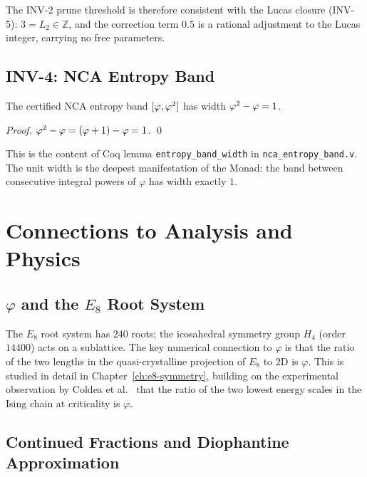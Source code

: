 The INV-2 prune threshold is therefore consistent with the Lucas closure
(INV-5): $3 = L_2 \in \mathbb{Z}$, and the correction term $0.5$ is a
rational adjustment to the Lucas integer, carrying no free parameters.

\subsection{INV-4: NCA Entropy Band}

\begin{lemma}[Band width = 1]\label{lem:band-width}
  The certified NCA entropy band $[\varphi, \varphi^{2}]$ has width
  $\varphi^{2} - \varphi = 1$.
\end{lemma}

\begin{proof}
  $\varphi^{2} - \varphi = (\varphi + 1) - \varphi = 1$.  \qed
\end{proof}

This is the content of Coq lemma \texttt{entropy\_band\_width} in
\texttt{nca\_entropy\_band.v}.  The unit width is the deepest
manifestation of the Monad: the band between consecutive integral
powers of $\varphi$ has width exactly $1$.


\section{Connections to Analysis and Physics}
\label{sec:monad-physics}

\subsection{$\varphi$ and the $E_8$ Root System}

The $E_8$ root system has 240 roots; the icosahedral symmetry group
$H_4$ (order $14400$) acts on a sublattice.  The key numerical
connection to $\varphi$ is that the ratio of the two lengths in the
quasi-crystalline projection of $E_8$ to 2D is $\varphi$.
This is studied in detail in Chapter~\ref{ch:e8-symmetry}, building on
the experimental observation by Coldea et al.\ \cite{coldea2010} that
the ratio of the two lowest energy scales in the Ising chain at criticality
is $\varphi$.

\subsection{Continued Fractions and Diophantine Approximation}

